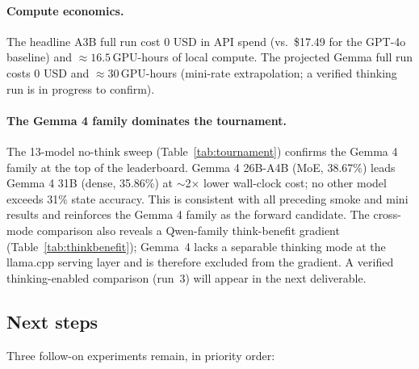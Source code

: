 \documentclass[11pt]{article}
\begin{document}
\paragraph{Compute economics.} The headline A3B full run cost $0$ USD in API spend (vs.\ \$17.49 for the GPT-4o baseline) and $\approx 16.5$\,GPU-hours of local compute. The projected Gemma full run costs $0$ USD and $\approx 30$\,GPU-hours (mini-rate extrapolation; a verified thinking run is in progress to confirm).

\paragraph{The Gemma 4 family dominates the tournament.} The 13-model no-think sweep (Table~\ref{tab:tournament}) confirms the Gemma 4 family at the top of the leaderboard. Gemma 4 26B-A4B (MoE, 38.67\%) leads Gemma 4 31B (dense, 35.86\%) at $\sim$2$\times$ lower wall-clock cost; no other model exceeds 31\% state accuracy. This is consistent with all preceding smoke and mini results and reinforces the Gemma 4 family as the forward candidate. The cross-mode comparison also reveals a Qwen-family think-benefit gradient (Table~\ref{tab:thinkbenefit}); Gemma~4 lacks a separable thinking mode at the llama.cpp serving layer and is therefore excluded from the gradient. A verified thinking-enabled comparison (run~3) will appear in the next deliverable.

\subsection{Next steps}
\label{sec:nextsteps}

Three follow-on experiments remain, in priority order:
\end{document}

